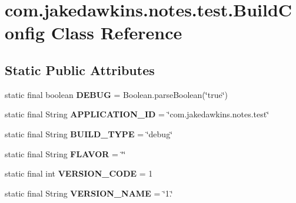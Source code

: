 \hypertarget{classcom_1_1jakedawkins_1_1notes_1_1test_1_1_build_config}{}\section{com.\+jakedawkins.\+notes.\+test.\+Build\+Config Class Reference}
\label{classcom_1_1jakedawkins_1_1notes_1_1test_1_1_build_config}
\subsection*{Static Public Attributes}
\begin{DoxyCompactItemize}
\item 
static final boolean {\bfseries D\+E\+B\+UG} = Boolean.\+parse\+Boolean(\char`\"{}true\char`\"{})\hypertarget{classcom_1_1jakedawkins_1_1notes_1_1test_1_1_build_config_a93a7aa34d269d32093c0c7841c344c21}{}\label{classcom_1_1jakedawkins_1_1notes_1_1test_1_1_build_config_a93a7aa34d269d32093c0c7841c344c21}

\item 
static final String {\bfseries A\+P\+P\+L\+I\+C\+A\+T\+I\+O\+N\+\_\+\+ID} = \char`\"{}com.\+jakedawkins.\+notes.\+test\char`\"{}\hypertarget{classcom_1_1jakedawkins_1_1notes_1_1test_1_1_build_config_a7d8efbfcda4f1e5346a5d97ae7b6a2a6}{}\label{classcom_1_1jakedawkins_1_1notes_1_1test_1_1_build_config_a7d8efbfcda4f1e5346a5d97ae7b6a2a6}

\item 
static final String {\bfseries B\+U\+I\+L\+D\+\_\+\+T\+Y\+PE} = \char`\"{}debug\char`\"{}\hypertarget{classcom_1_1jakedawkins_1_1notes_1_1test_1_1_build_config_ae2ab9f6e62df37d23ebfed8c455a18f7}{}\label{classcom_1_1jakedawkins_1_1notes_1_1test_1_1_build_config_ae2ab9f6e62df37d23ebfed8c455a18f7}

\item 
static final String {\bfseries F\+L\+A\+V\+OR} = \char`\"{}\char`\"{}\hypertarget{classcom_1_1jakedawkins_1_1notes_1_1test_1_1_build_config_a176c1729c6b71b049887522b3dfd817e}{}\label{classcom_1_1jakedawkins_1_1notes_1_1test_1_1_build_config_a176c1729c6b71b049887522b3dfd817e}

\item 
static final int {\bfseries V\+E\+R\+S\+I\+O\+N\+\_\+\+C\+O\+DE} = 1\hypertarget{classcom_1_1jakedawkins_1_1notes_1_1test_1_1_build_config_a08d64c9b888481cf55efb26056dfd06a}{}\label{classcom_1_1jakedawkins_1_1notes_1_1test_1_1_build_config_a08d64c9b888481cf55efb26056dfd06a}

\item 
static final String {\bfseries V\+E\+R\+S\+I\+O\+N\+\_\+\+N\+A\+ME} = \char`\"{}1.\char`\"{}\hypertarget{classcom_1_1jakedawkins_1_1notes_1_1test_1_1_build_config_aa753ff9b82fad8cc62cc6f67cf53fcbc}{}\label{classcom_1_1jakedawkins_1_1notes_1_1test_1_1_build_config_aa753ff9b82fad8cc62cc6f67cf53fcbc}

\end{DoxyCompactItemize}


